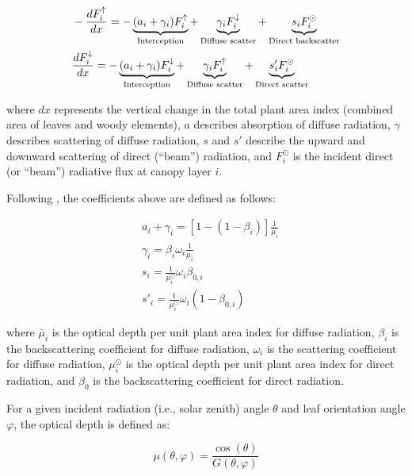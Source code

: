 \begin{align}
  & - \frac{dF^{\uparrow}_{i}}{dx} =
  - \underbrace{(a_{i} + \gamma_{i}) F^{\uparrow}_{i}}_{\text{Interception}}
  + \underbrace{\gamma_{i} F^{\downarrow}_{i}}_{\text{Diffuse scatter}}
  + \underbrace{s_{i} F^{\odot}_{i}}_{\text{Direct backscatter}} \label{eqn:twostream-up} \\
  & \frac{dF^{\downarrow}_{i}}{dx} =
  - \underbrace{(a_{i} + \gamma_{i}) F^{\downarrow}_{i}}_{\text{Interception}}
  + \underbrace{\gamma_{i} F^{\uparrow}_{i}}_{\text{Diffuse scatter}}
  + \underbrace{s'_{i} F^{\odot}_{i}}_{\text{Direct scatter}} \label{eqn:twostream-down}
\end{align}

where $dx$ represents the vertical change in the total plant area index (combined area of leaves and woody elements),
$a$ describes absorption of diffuse radiation,
$\gamma$ describes scattering of diffuse radiation,
$s$ and $s'$ describe the upward and downward scattering of direct (``beam'') radiation,
and $F^{\odot}_{i}$ is the incident direct (or ``beam'') radiative flux at canopy layer $i$.

Following \citet{sellers1985canopy}, the coefficients above are defined as follows:

\begin{align}
  & a_{i} + \gamma_{i} = \left[1 - \left( 1 - \beta_{i} \right)\right]\frac{1}{\bar{\mu}_{i}} \\
  & \gamma_{i} = \beta_{i} \omega_{i} \frac{1}{\bar{\mu}_{i}} \\
  & s_{i} = \frac{1}{\mu^{\odot}_{i}} \omega_{i} \beta_{0,i} \\
  & s'_{i} = \frac{1}{\mu^{\odot}_{i}} \omega_{i} \left( 1 - \beta_{0,i} \right)
\end{align}

where
$\bar{\mu}_{i}$ is the optical depth per unit plant area index for diffuse radiation,
$\beta_{i}$ is the backscattering coefficient for diffuse radiation,
$\omega_{i}$ is the scattering coefficient for diffuse radiation,
$\mu^{\odot}_{i}$ is the optical depth per unit plant area index for direct radiation,
and $\beta_{0}$ is the backscattering coefficient for direct radiation.

For a given incident radiation (i.e., solar zenith) angle $\theta$ and leaf orientation angle $\varphi$, the optical depth is defined as:

\begin{equation}\label{eqn:opticaldepth}
  \mu \left( \theta, \varphi \right) = \frac{\cos(\theta)}{G(\theta, \varphi)}
\end{equation}

